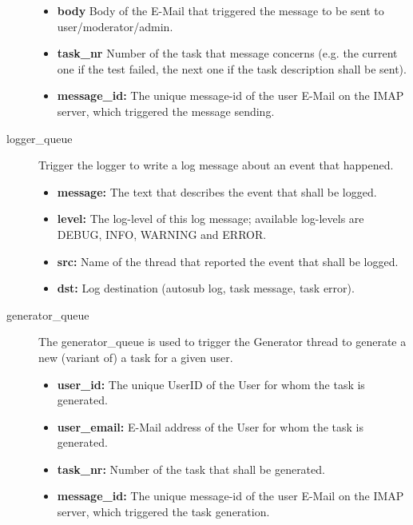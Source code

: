 \begin{description}
\begin{itemize}
\begin{itemize}
            \end{itemize}

        \item{\bf body} Body of the E-Mail that triggered the message to be sent to user/moderator/admin.
        \item {\bf task\_nr} Number of the task that message concerns (e.g. the current
            one if the test failed, the next one if the task description shall be sent).
        \item {\bf message\_id:} The unique message-id of the user E-Mail on the IMAP server,
            which triggered the message sending.
    \end{itemize}

\item [logger\_queue] Trigger the logger to write a log message about an event that happened.
    \begin{itemize}
        \item {\bf message:} The text that describes the event that shall be logged.
        \item {\bf level:} The log-level of this log message; available log-levels
            are DEBUG, INFO, WARNING and ERROR.
        \item {\bf src:} Name of the thread that reported the event that shall be logged.
        \item {\bf dst:} Log destination (autosub log, task message, task error).
    \end{itemize}

\item [generator\_queue] The generator\_queue is used to trigger the Generator thread
    to generate a new (variant of) a task for a given user.
	\begin{itemize}
        \item {\bf user\_id:} The unique UserID of the User for whom the task is generated.
        \item {\bf user\_email:} E-Mail address of the User for whom the task is generated.
        \item {\bf task\_nr:} Number of the task that shall be generated.
        \item {\bf message\_id:} The unique message-id of the user E-Mail on the IMAP server,
            which triggered the task generation.
    \end{itemize}


\end{description}
